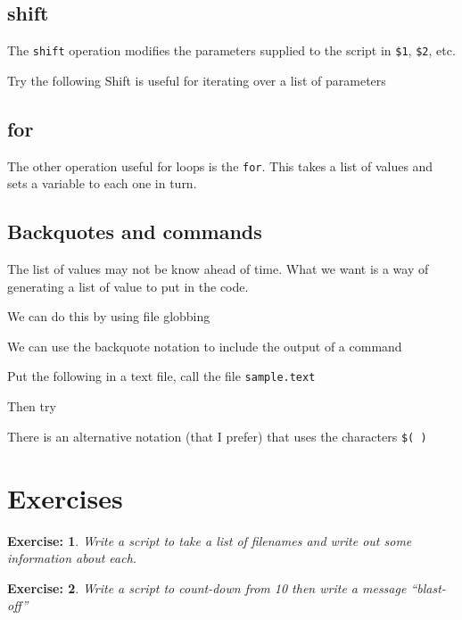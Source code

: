\documentclass[a4paper]{article}
\newtheorem{exercise}{Exercise:}
\begin{document}
\subsection{shift}
The \texttt{shift} operation modifies the parameters supplied to the
script in \texttt{\$1}, \texttt{\$2}, etc.

Try the following
Shift is useful for iterating over a list of parameters

\subsection{for}
The other operation useful for loops is the \texttt{for}.
This takes a list of values and sets a variable to each one in turn.

\subsection{Backquotes and commands}
The list of values may not be know ahead of time.  What we want is a
way of generating a list of value to put in the code.

We can do this by using file globbing

We can use the backquote notation to include the output of a command

Put the following in a text file, call the file \texttt{sample.text}



Then try

There is an alternative notation (that I prefer) that uses the
characters \texttt{\$( )}

\section{Exercises}
\begin{exercise}
  Write a script to take a list of filenames and write out some
  information about each.
\end{exercise}

\begin{exercise}
Write a script to count-down from
10 then write a message ``blast-off''
\end{exercise}
\end{document}
